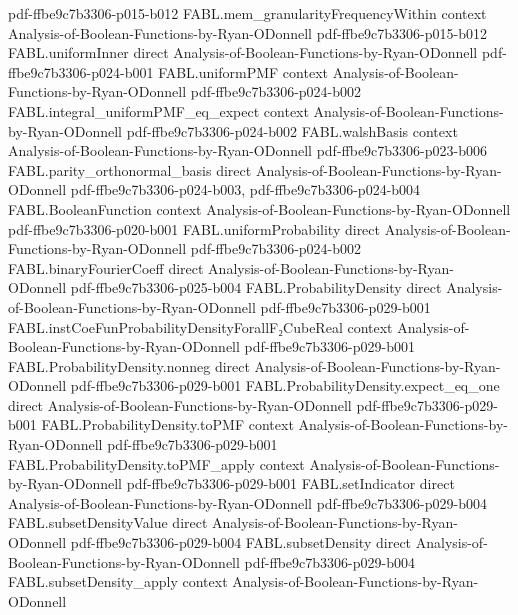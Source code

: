 \begin{theorem}
  {pdf-ffbe9c7b3306-p015-b012}
\proofstep
  {FABL.mem_granularityFrequencyWithin}
  {context}
  {Analysis-of-Boolean-Functions-by-Ryan-ODonnell}
  {pdf-ffbe9c7b3306-p015-b012}
\proofstep
  {FABL.uniformInner}
  {direct}
  {Analysis-of-Boolean-Functions-by-Ryan-ODonnell}
  {pdf-ffbe9c7b3306-p024-b001}
\proofstep
  {FABL.uniformPMF}
  {context}
  {Analysis-of-Boolean-Functions-by-Ryan-ODonnell}
  {pdf-ffbe9c7b3306-p024-b002}
\proofstep
  {FABL.integral_uniformPMF_eq_expect}
  {context}
  {Analysis-of-Boolean-Functions-by-Ryan-ODonnell}
  {pdf-ffbe9c7b3306-p024-b002}
\proofstep
  {FABL.walshBasis}
  {context}
  {Analysis-of-Boolean-Functions-by-Ryan-ODonnell}
  {pdf-ffbe9c7b3306-p023-b006}
\proofstep
  {FABL.parity_orthonormal_basis}
  {direct}
  {Analysis-of-Boolean-Functions-by-Ryan-ODonnell}
  {pdf-ffbe9c7b3306-p024-b003,
    pdf-ffbe9c7b3306-p024-b004}
\proofstep
  {FABL.BooleanFunction}
  {context}
  {Analysis-of-Boolean-Functions-by-Ryan-ODonnell}
  {pdf-ffbe9c7b3306-p020-b001}
\proofstep
  {FABL.uniformProbability}
  {direct}
  {Analysis-of-Boolean-Functions-by-Ryan-ODonnell}
  {pdf-ffbe9c7b3306-p024-b002}
\proofstep
  {FABL.binaryFourierCoeff}
  {direct}
  {Analysis-of-Boolean-Functions-by-Ryan-ODonnell}
  {pdf-ffbe9c7b3306-p025-b004}
\proofstep
  {FABL.ProbabilityDensity}
  {direct}
  {Analysis-of-Boolean-Functions-by-Ryan-ODonnell}
  {pdf-ffbe9c7b3306-p029-b001}
\proofstep
  {FABL.instCoeFunProbabilityDensityForallF₂CubeReal}
  {context}
  {Analysis-of-Boolean-Functions-by-Ryan-ODonnell}
  {pdf-ffbe9c7b3306-p029-b001}
\proofstep
  {FABL.ProbabilityDensity.nonneg}
  {direct}
  {Analysis-of-Boolean-Functions-by-Ryan-ODonnell}
  {pdf-ffbe9c7b3306-p029-b001}
\proofstep
  {FABL.ProbabilityDensity.expect_eq_one}
  {direct}
  {Analysis-of-Boolean-Functions-by-Ryan-ODonnell}
  {pdf-ffbe9c7b3306-p029-b001}
\proofstep
  {FABL.ProbabilityDensity.toPMF}
  {context}
  {Analysis-of-Boolean-Functions-by-Ryan-ODonnell}
  {pdf-ffbe9c7b3306-p029-b001}
\proofstep
  {FABL.ProbabilityDensity.toPMF_apply}
  {context}
  {Analysis-of-Boolean-Functions-by-Ryan-ODonnell}
  {pdf-ffbe9c7b3306-p029-b001}
\proofstep
  {FABL.setIndicator}
  {direct}
  {Analysis-of-Boolean-Functions-by-Ryan-ODonnell}
  {pdf-ffbe9c7b3306-p029-b004}
\proofstep
  {FABL.subsetDensityValue}
  {direct}
  {Analysis-of-Boolean-Functions-by-Ryan-ODonnell}
  {pdf-ffbe9c7b3306-p029-b004}
\proofstep
  {FABL.subsetDensity}
  {direct}
  {Analysis-of-Boolean-Functions-by-Ryan-ODonnell}
  {pdf-ffbe9c7b3306-p029-b004}
\proofstep
  {FABL.subsetDensity_apply}
  {context}
  {Analysis-of-Boolean-Functions-by-Ryan-ODonnell}

\end{theorem}
